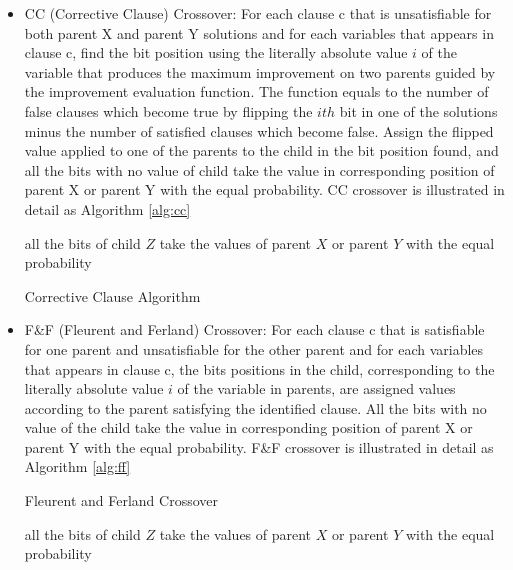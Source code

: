 \begin{itemize}
	\item
	      CC (Corrective Clause) Crossover: For each clause c that is unsatisfiable for
	      both parent X and parent Y solutions and for each variables that appears in
	      clause c, find the bit position using the literally absolute value
	      $i$ of the variable that produces the maximum improvement on
	      two parents guided by the improvement evaluation function. The function equals
	      to the number of false clauses which become true by flipping the
	      $ith$ bit in one of the solutions minus the number of
	      satisfied clauses which become false. Assign the flipped value applied to one
	      of the parents to the child in the bit position found, and all the bits with
	      no value of child take the value in corresponding position of parent X or
	      parent Y with the equal probability. CC crossover is illustrated in detail as Algorithm \ref{alg:cc}
		\begin{algorithm}
		\SetAlgoLined
		\label{alg:cc} 
		\BlankLine
			all the bits of child $Z$ take the values of parent $X$ or parent $Y$ with the equal probability\;
		\caption{Corrective Clause Algorithm}
		\end{algorithm}
	\item
	      F\&F (Fleurent and Ferland) Crossover: For each clause c that is satisfiable
	      for one parent and unsatisfiable for the other parent and for each variables
	      that appears in clause c, the bits positions in the child, corresponding to
	      the literally absolute value $i$ of the variable in parents,
	      are assigned values according to the parent satisfying the identified clause.
	      All the bits with no value of the child take the value in corresponding
	      position of parent X or parent Y with the equal probability. F\&F crossover is illustrated in detail as Algorithm \ref{alg:ff}
		  \begin{algorithm}
			\SetAlgoLined
			\label{alg:ff} 
			\caption{Fleurent and Ferland Crossover}
			\KwData{two parents $X$ and $Y$}
			\KwResult{one child $Z$}
			\BlankLine
			  all the bits of child $Z$ take the values of parent $X$ or parent $Y$ with the equal probability\;

\end{algorithm}
\end{itemize}

